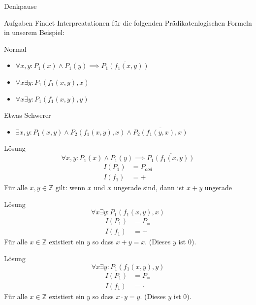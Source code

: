 {
\begin{frame}[fragile]{Denkpause}
    \footnotesize
        \begin{alertblock}{Aufgaben}
            Findet Interpreatationen für die folgenden Prädikatenlogischen Formeln in unserem Beispiel:
        \end{alertblock}
        \begin{block}{Normal}
            \begin{itemize}
                \item $\forall x,y : P_1(x) \wedge P_1(y) \implies \overline{P_1(f_1(x,y))}$
                \item $\forall x\exists y: P_1(f_1(x,y),x)$
                \item $\forall x\exists y: P_1(f_1(x,y),y)$
            \end{itemize}
        \end{block}
        \begin{block}{Etwas Schwerer}
            \begin{itemize}
                \item $\exists x,y: P_1(x,y) \wedge P_2(f_1(x,y),x) \wedge \overline{P_2(f_1(y,x),x)}$
            \end{itemize}
        \end{block}
\end{frame}

\begin{frame}{Lösung}
    $$\forall x,y : P_1(x) \wedge P_1(y) \implies \overline{P_1(f_1(x,y))}$$
        \begin{align*}
            I(P_1) &= P_{ood}\\
            I(f_1) &= +
        \end{align*}
        Für alle $x,y \in \mathbb Z$ gilt: wenn $x$ und $x$ ungerade sind, dann ist $x+y$ ungerade
\end{frame}

\begin{frame}{Lösung}
    $$\forall x\exists y: P_1(f_1(x,y),x)$$
        \begin{align*}
            I(P_1) &= P_{=}\\
            I(f_1) &= +
        \end{align*}
        Für alle $x \in \mathbb Z$ existiert ein $y$ so dass $x+y = x$. (Dieses $y$ ist $0$).
\end{frame}

\begin{frame}{Lösung}
    $$\forall x\exists y: P_1(f_1(x,y),y)$$
        \begin{align*}
            I(P_1) &= P_{=}\\
            I(f_1) &= \cdot
        \end{align*}
        Für alle $x \in \mathbb Z$ existiert ein $y$ so dass $x\cdot y = y$. (Dieses $y$ ist $0$).
\end{frame}

}
